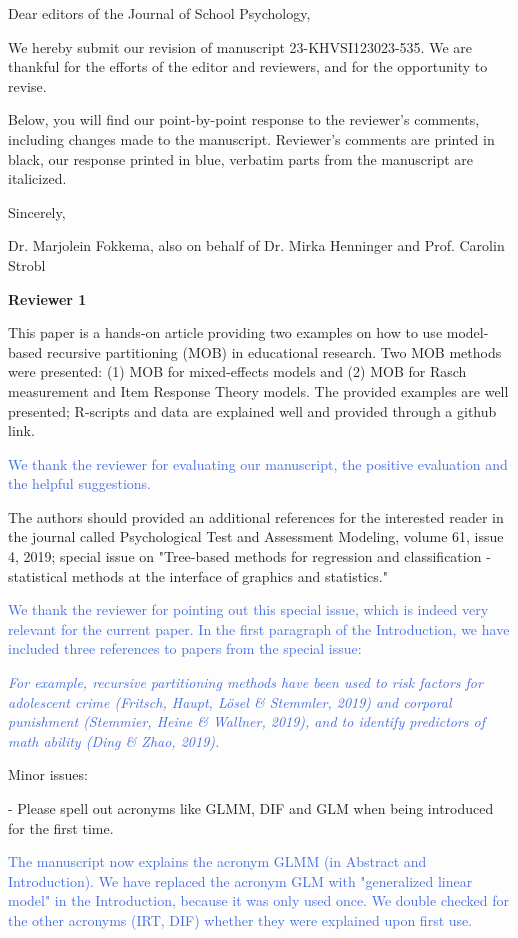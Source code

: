 \documentclass{letter}
\newcommand{\auth}[1]{\textcolor{RoyalBlue}{#1}}
\begin{document}
Dear editors of the Journal of School Psychology,

We hereby submit our revision of manuscript 23-KHVSI123023-535. We are thankful for the efforts of the editor and reviewers, and for the opportunity to revise. 

Below, you will find our point-by-point response to the reviewer's comments, including changes made to the manuscript. Reviewer's comments are printed in black, our response printed in blue, verbatim parts from the manuscript are italicized.

Sincerely,

Dr. Marjolein Fokkema, also on behalf of Dr. Mirka Henninger and Prof. Carolin Strobl


\textbf{Reviewer 1}

This paper is a hands-on article providing two examples on how to use model-based recursive partitioning (MOB) in educational research. Two MOB methods were presented: (1) MOB for mixed-effects models and (2) MOB for Rasch measurement and Item Response Theory models. The provided examples are well presented; R-scripts and data are explained well and provided through a github link.

\auth{We thank the reviewer for evaluating our manuscript, the positive evaluation and the helpful suggestions.}

The authors should provided an additional references for the interested reader in the journal called Psychological Test and Assessment Modeling, volume 61, issue 4, 2019; special issue on "Tree-based methods for regression and classification - statistical methods at the interface of graphics and statistics."

\auth{We thank the reviewer for pointing out this special issue, which is indeed very relevant for the current paper. In the first paragraph of the Introduction, we have included three references to papers from the special issue:} 

\auth{\textit{For example, recursive partitioning methods have been used to risk factors for adolescent crime (Fritsch, Haupt, Lösel \& Stemmler, 2019) and corporal punishment (Stemmier, Heine \& Wallner, 2019), and to identify predictors of math ability (Ding \& Zhao, 2019).}}


Minor issues:

- Please spell out acronyms like GLMM, DIF and GLM when being introduced for the first time.

\auth{The manuscript now explains the acronym GLMM (in Abstract and Introduction). We have replaced the acronym GLM with "generalized linear model" in the Introduction, because it was only used once. We double checked for the other acronyms (IRT, DIF) whether they were explained upon first use.}
\end{document}
